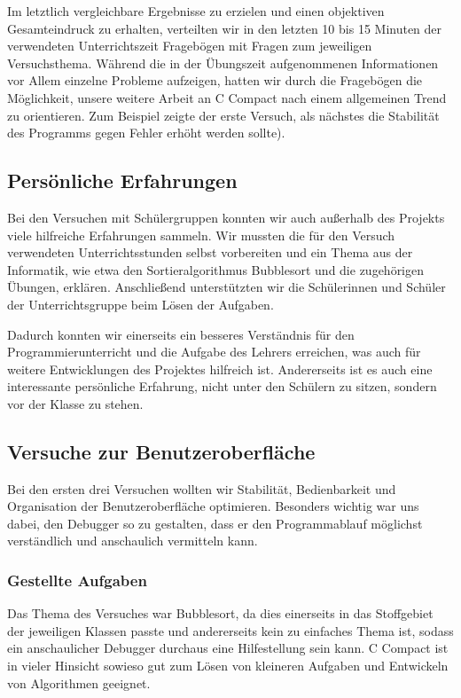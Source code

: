 Im letztlich vergleichbare Ergebnisse zu erzielen und einen objektiven Gesamteindruck zu erhalten, verteilten wir in den letzten 10 bis 15 Minuten der verwendeten Unterrichtszeit Fragebögen mit Fragen zum jeweiligen Versuchsthema. Während die in der Übungszeit aufgenommenen Informationen vor Allem einzelne Probleme aufzeigen, hatten wir durch die Fragebögen die Möglichkeit, unsere weitere Arbeit an C Compact nach einem allgemeinen Trend zu orientieren. Zum Beispiel zeigte der erste Versuch, als nächstes die Stabilität des Programms gegen Fehler erhöht werden sollte).

\subsection{Persönliche Erfahrungen}
Bei den Versuchen mit Schülergruppen konnten wir auch außerhalb des Projekts viele hilfreiche Erfahrungen sammeln. Wir mussten die für den Versuch verwendeten Unterrichtsstunden selbst vorbereiten und ein Thema aus der Informatik, wie etwa den Sortieralgorithmus \glqq{}Bubblesort\grqq{} und die zugehörigen Übungen, erklären. Anschließend unterstützten wir die Schülerinnen und Schüler der Unterrichtsgruppe beim Lösen der Aufgaben.

Dadurch konnten wir einerseits ein besseres Verständnis für den Programmierunterricht und die Aufgabe des Lehrers erreichen, was auch für weitere Entwicklungen des Projektes hilfreich ist. Andererseits ist es auch eine interessante persönliche Erfahrung, nicht unter den Schülern zu sitzen, sondern vor der Klasse zu stehen.

\subsection{Versuche zur Benutzeroberfläche}
Bei den ersten drei Versuchen wollten wir Stabilität, Bedienbarkeit und Organisation der Benutzeroberfläche optimieren. Besonders wichtig war uns dabei, den Debugger so zu gestalten, dass er den Programmablauf möglichst verständlich und anschaulich vermitteln kann.

\subsubsection*{Gestellte Aufgaben}
Das Thema des Versuches war Bubblesort, da dies einerseits in das Stoffgebiet der jeweiligen Klassen passte und andererseits kein zu einfaches Thema ist, sodass ein anschaulicher Debugger durchaus eine Hilfestellung sein kann. C Compact ist in vieler Hinsicht sowieso gut zum Lösen von kleineren Aufgaben und Entwickeln von Algorithmen geeignet.

